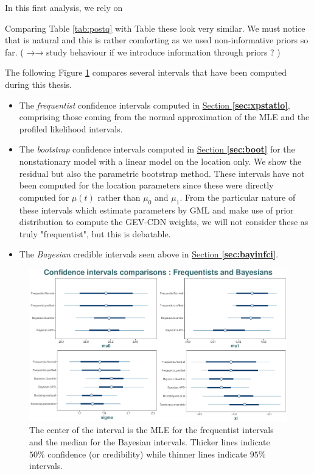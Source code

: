 In this first analysis, we rely on 



Comparing Table \ref{tab:postq} with Table 
 these look very similar. We must notice that is natural and this is rather comforting as we used non-informative priors so far. ( →→ study behaviour if we introduce information through priors ? )

The following Figure \ref{fig:cicomp} compares several intervals that have been computed during this thesis. 

\begin{itemize}
	\item The \emph{frequentist} confidence intervals computed in
	\hyperref[sec:xpstatio]{Section \textbf{\ref{sec:xpstatio}}}, comprising those coming from the normal approximation of the MLE and the profiled likelihood intervals.
	\item The \emph{bootstrap} confidence intervals computed in  \hyperref[sec:boot]{Section \textbf{\ref{sec:boot}}} for the nonstationary model with  a linear model on the location only. We show the residual but also the parametric bootstrap method. These intervals have not been computed for the location parameters since these were directly computed for $\mu(t)$ rather than $\mu_0$ and $\mu_1$. From the particular nature of these intervals which estimate parameters by GML and make use of prior distribution to compute the GEV-CDN weights, we will not consider these as truly "frequentist", but this is debatable.
	\item The \emph{Bayesian} credible intervals seen  above in \hyperref[sec:bayinfci]{Section \textbf{\ref{sec:bayinfci}}}.
\end{itemize}

\begin{figure}[!htb]
	\centering	\includegraphics[width=0.9\linewidth]{cicomp.pdf}\caption{The center of the interval is the MLE for the frequentist intervals and the median for the Bayesian intervals. Thicker lines indicate $50\%$ confidence (or credibility) while thinner lines indicate $95\%$ intervals.}\label{fig:cicomp}
\end{figure}

